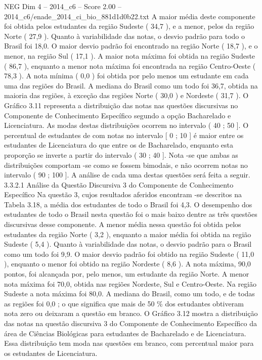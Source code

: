 \begin{textsample}{NEG Dim 4 – 2014\_c6 – Score 2.00 – 2014\_c6/enade\_2014\_ci\_bio\_881d1d0b22.txt}
A maior média deste componente foi obtida pelos estudantes da região Sudeste ( 34,7 ), e a menor, pelos da região Norte ( 27,9 ).
Quanto à variabilidade das notas, o desvio padrão para todo o Brasil foi 18,0.
O maior desvio padrão foi encontrado na região Norte ( 18,7 ), e o menor, na região Sul ( 17,1 ).
A maior nota máxima foi obtida na região Sudeste ( 86,7 ), enquanto a menor nota máxima foi encontrada na região Centro-Oeste ( 78,3 ).
A nota mínima ( 0,0 ) foi obtida por pelo menos um estudante em cada uma das regiões do Brasil.
A mediana do Brasil como um todo foi 36,7, obtida na maioria das regiões, à exceção das regiões Norte ( 30,0 ) e Nordeste ( 31,7 ).
O Gráfico 3.11 representa a distribuição das notas nas questões discursivas no Componente de Conhecimento Específico segundo a opção Bacharelado e Licenciatura.
As modas destas distribuições ocorrem no intervalo ( 40 ; 50 ].
O percentual de estudantes de com notas no intervalo [ 0 ; 10 ] é maior entre os estudantes de Licenciatura do que entre os de Bacharelado, enquanto esta proporção se inverte a partir do intervalo ( 30 ; 40 ].
Nota -se que ambas as distribuições comportam -se como se fossem bimodais, e não ocorrem notas no intervalo ( 90 ; 100 ].
A análise de cada uma destas questões será feita a seguir. 3.3.2.1 Análise da Questão Discursiva 3 do Componente de Conhecimento Específico Na questão 3, cujos resultados aferidos encontram -se descritos na Tabela 3.18, a média dos estudantes de todo o Brasil foi 4,3.
O desempenho dos estudantes de todo o Brasil nesta questão foi o mais baixo dentre as três questões discursivas desse componente.
A menor média nessa questão foi obtida pelos estudantes da região Norte ( 3,2 ), enquanto a maior média foi obtida na região Sudeste ( 5,4 ).
Quanto à variabilidade das notas, o desvio padrão para o Brasil como um todo foi 9,9.
O maior desvio padrão foi obtido na região Sudeste ( 11,0 ), enquanto o menor foi obtido na região Nordeste ( 8,6 ).
A nota máxima, 90,0 pontos, foi alcançada por, pelo menos, um estudante da região Norte.
A menor nota máxima foi 70,0, obtida nas regiões Nordeste, Sul e Centro-Oeste.
Na região Sudeste a nota máxima foi 80,0.
A mediana do Brasil, como um todo, e de todas as regiões foi 0,0 ; o que significa que mais de 50 \% dos estudantes obtiveram nota zero ou deixaram a questão em branco.
O Gráfico 3.12 mostra a distribuição das notas na questão discursiva 3 do Componente de Conhecimento Específico da área de Ciências Biológicas para estudantes de Bacharelado e de Licenciatura.
Essa distribuição tem moda nas questões em branco, com percentual maior para os estudantes de Licenciatura.

\end{textsample}
